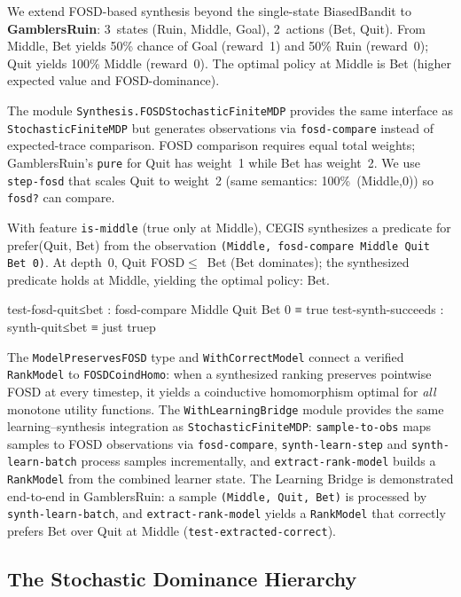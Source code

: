 \documentclass[9pt,a4paper]{article}
\theoremstyle{plain}
\theoremstyle{definition}
\theoremstyle{remark}
\begin{document}
We extend FOSD-based synthesis beyond the single-state BiasedBandit to \textbf{GamblersRuin}: 3~states (Ruin, Middle, Goal), 2~actions (Bet, Quit).
From Middle, Bet yields 50\% chance of Goal (reward~1) and 50\% Ruin (reward~0); Quit yields 100\% Middle (reward~0).
The optimal policy at Middle is Bet (higher expected value and FOSD-dominance).

The module \texttt{Synthesis.FOSDStochasticFiniteMDP} provides the same interface
as \texttt{StochasticFiniteMDP} but generates observations via \texttt{fosd-compare} instead of expected-trace comparison.
FOSD comparison requires equal total weights; GamblersRuin's \texttt{pure} for Quit has weight~1 while Bet has weight~2.
We use \texttt{step-fosd} that scales Quit to weight~2 (same semantics: 100\%~(Middle,0)) so \texttt{fosd?} can compare.

With feature \texttt{is-middle} (true only at Middle), CEGIS synthesizes a predicate for prefer(Quit, Bet) from the observation \texttt{(Middle, fosd-compare Middle Quit Bet 0)}.
At depth~0, Quit FOSD$\le$~Bet (Bet dominates); the synthesized predicate holds at Middle, yielding the optimal policy: Bet.

\begin{spec}
test-fosd-quit≤bet : fosd-compare Middle Quit Bet 0 ≡ true
test-synth-succeeds : synth-quit≤bet ≡ just truep
\end{spec}
The \texttt{ModelPreservesFOSD} type and \texttt{WithCorrectModel} connect a verified \texttt{RankModel} to \texttt{FOSDCoindHomo}: when a synthesized ranking preserves pointwise FOSD at every timestep, it yields a coinductive homomorphism optimal for \emph{all} monotone utility functions.
The \texttt{WithLearningBridge} module provides the same learning--synthesis integration as \texttt{StochasticFiniteMDP}: \texttt{sample-to-obs} maps samples to FOSD observations via \texttt{fosd-compare}, \texttt{synth-learn-step} and \texttt{synth-learn-batch} process samples incrementally, and \texttt{extract-rank-model} builds a \texttt{RankModel} from the combined learner state.
The Learning Bridge is demonstrated end-to-end in GamblersRuin: a sample \texttt{(Middle, Quit, Bet)} is processed by \texttt{synth-learn-batch}, and \texttt{extract-rank-model} yields a \texttt{RankModel} that correctly prefers Bet over Quit at Middle (\texttt{test-extracted-correct}).

\subsection{The Stochastic Dominance Hierarchy}
\label{sec:sd-hierarchy}
\end{document}

